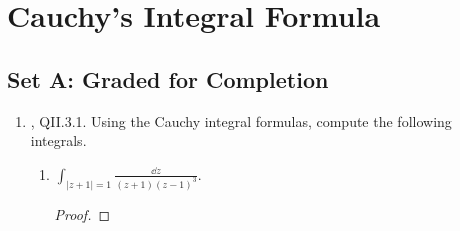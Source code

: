 \documentclass[../psets.tex]{subfiles}
\begin{document}
\section{Cauchy's Integral Formula}
\subsection*{Set A: Graded for Completion}
\begin{enumerate}[ref={A.\arabic*}]
    \item {}\textcite{bib:FischerLieb}, QII.3.1. Using the Cauchy integral formulas, compute the following integrals.
    \begin{enumerate}
        \item $\displaystyle\int_{|z+1|=1}\frac{\dd{z}}{(z+1)(z-1)^3}$.
        \begin{proof}



\end{proof}
\end{enumerate}
\end{enumerate}
\end{document}
